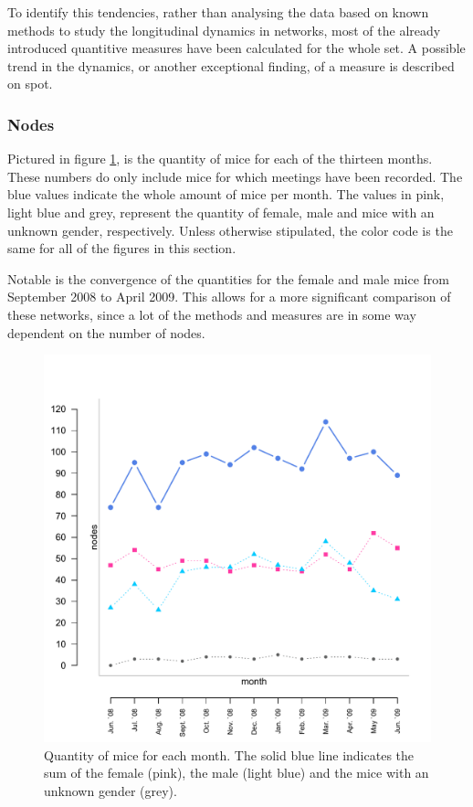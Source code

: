 To identify this tendencies, rather than analysing the data based on known methods to study the longitudinal dynamics in networks\cite{snijders:05}, most of the already introduced quantitive measures have been calculated for the whole set. A possible trend in the dynamics, or another exceptional finding, of a measure is described on spot.

\subsubsection{Nodes}

Pictured in figure \ref{fig:long_node}, is the quantity of mice for each of the thirteen months. These numbers do only include mice for which meetings have been recorded. The blue values indicate the whole amount of mice per month. The values in pink, light blue and grey, represent the quantity of female, male and mice with an unknown gender, respectively. Unless otherwise stipulated, the color code is the same for all of the figures in this section.

Notable is the convergence of the quantities for the female and male mice from September 2008 to April 2009. This allows for a more significant comparison of these networks, since a lot of the methods and measures are in some way dependent on the number of nodes.  

\begin{figure}[htpb]
\begin{center}
  \includegraphics[width=.6\textwidth]{assets/pdf/long_nodes.pdf}
  \caption[Number of mice over the months]{Quantity of mice for each month. The solid blue line indicates the sum of the female (pink), the male (light blue) and the mice with an unknown gender (grey).}
  \label{fig:long_node}
\end{center}
\end{figure}

